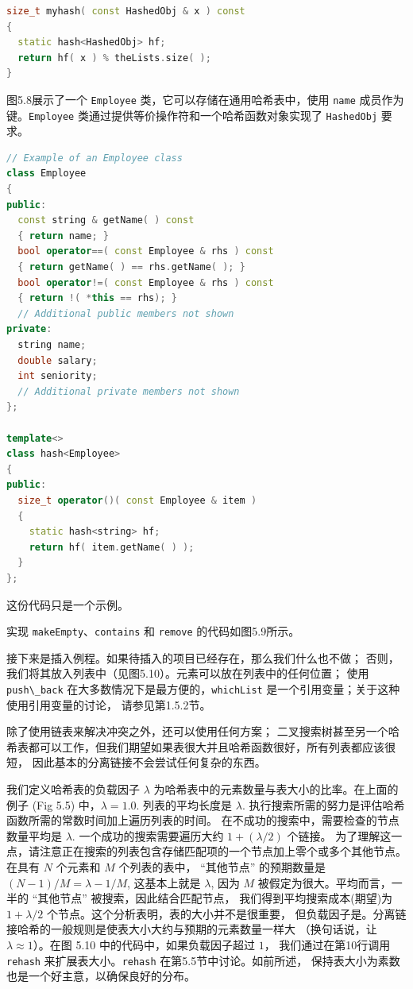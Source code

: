 \documentclass[a4paper]{ctexart}
\theoremstyle{definition}
\theoremstyle{definition}
\begin{document}
\begin{lstlisting}[language=C++]
size_t myhash( const HashedObj & x ) const
{
  static hash<HashedObj> hf;
  return hf( x ) % theLists.size( );
}  
\end{lstlisting}

图5.8展示了一个 \verb|Employee| 类，它可以存储在通用哈希表中，使用 \verb|name| 成员作为键。\verb|Employee|
类通过提供等价操作符和一个哈希函数对象实现了 \verb|HashedObj| 要求。

\begin{lstlisting}[language=C++]
// Example of an Employee class
class Employee
{
public:
  const string & getName( ) const
  { return name; }
  bool operator==( const Employee & rhs ) const
  { return getName( ) == rhs.getName( ); }
  bool operator!=( const Employee & rhs ) const
  { return !( *this == rhs); }
  // Additional public members not shown
private:
  string name;
  double salary;
  int seniority;
  // Additional private members not shown
};
  
template<>
class hash<Employee>
{
public:
  size_t operator()( const Employee & item )
  {
    static hash<string> hf;
    return hf( item.getName( ) );
  }
};
\end{lstlisting}

这份代码只是一个示例。

实现 \verb|makeEmpty|、\verb|contains| 和 \verb|remove| 的代码如图5.9所示。

接下来是插入例程。如果待插入的项目已经存在，那么我们什么也不做；
否则，我们将其放入列表中（见图5.10）。元素可以放在列表中的任何位置；
使用 \verb|push\_back| 在大多数情况下是最方便的，\verb|whichList| 是一个引用变量；关于这种使用引用变量的讨论，
请参见第1.5.2节。

除了使用链表来解决冲突之外，还可以使用任何方案；
二叉搜索树甚至另一个哈希表都可以工作，但我们期望如果表很大并且哈希函数很好，所有列表都应该很短，
因此基本的分离链接不会尝试任何复杂的东西。

我们定义哈希表的负载因子 $\lambda$ 为哈希表中的元素数量与表大小的比率。在上面的例子 (Fig 5.5) 中，$\lambda = 1.0$. 
列表的平均长度是 $\lambda$. 执行搜索所需的努力是评估哈希函数所需的常数时间加上遍历列表的时间。
在不成功的搜索中，需要检查的节点数量平均是 $\lambda$. 一个成功的搜索需要遍历大约 $1 + (\lambda/2)$ 个链接。
为了理解这一点，请注意正在搜索的列表包含存储匹配项的一个节点加上零个或多个其他节点。
在具有 $N$ 个元素和 $M$ 个列表的表中， ``其他节点'' 的预期数量是 $(N - 1)/M = \lambda - 1/M$, 
这基本上就是 $\lambda$, 因为 $M$ 被假定为很大。平均而言，一半的 ``其他节点'' 被搜索，因此结合匹配节点，
我们得到平均搜索成本(期望)为 $1 + \lambda/2$ 个节点。这个分析表明，表的大小并不是很重要，
但负载因子是。分离链接哈希的一般规则是使表大小大约与预期的元素数量一样大
（换句话说，让 $\lambda \approx 1$）。在图 5.10 中的代码中，如果负载因子超过 $1$，
我们通过在第10行调用 \verb|rehash| 来扩展表大小。\verb|rehash| 在第5.5节中讨论。如前所述，
保持表大小为素数也是一个好主意，以确保良好的分布。
\end{document}
